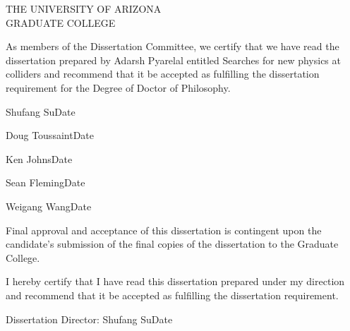 \cleardoublepage
\begin{center}
THE UNIVERSITY OF ARIZONA\\
GRADUATE COLLEGE
\end{center}
As members of the Dissertation Committee, we certify that we have read the dissertation prepared by Adarsh Pyarelal entitled Searches for new physics at colliders and recommend that it be accepted as fulfilling the dissertation requirement for the Degree of Doctor of Philosophy.
\vfill
\bigskip\bigskip

\noindent \hrulefill

\smallskip

\noindent Shufang Su\hfill Date
\bigskip\bigskip

\noindent \hrulefill
\smallskip

\noindent Doug Toussaint\hfill Date
\bigskip\bigskip

\noindent \hrulefill
\smallskip

\noindent Ken Johns\hfill Date
\bigskip\bigskip

\noindent \hrulefill

\smallskip

\noindent Sean Fleming\hfill Date
\bigskip\bigskip

\noindent \hrulefill

\smallskip

\noindent Weigang Wang\hfill Date
\vfill

Final approval and acceptance of this dissertation is contingent upon the candidate’s submission of the final copies of the dissertation to the Graduate College. 

I hereby certify that I have read this dissertation prepared under my direction and recommend that it be accepted as fulfilling the dissertation requirement.

\bigskip\bigskip
\noindent\hrulefill
\smallskip

\noindent Dissertation Director: Shufang Su\hfill Date

